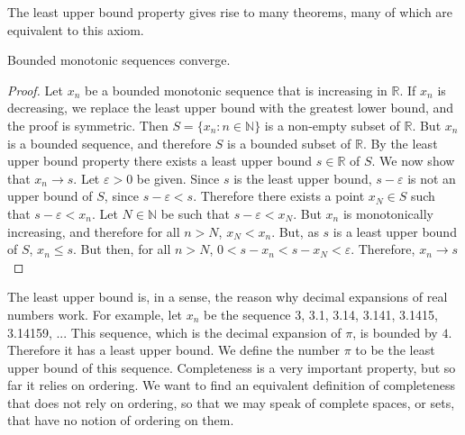 \documentclass[crop=false,class=article,oneside]{standalone}
\begin{document}
            The least upper bound property gives rise
            to many theorems, many of which are equivalent
            to this axiom.
            \begin{theorem}
                Bounded monotonic sequences converge.
            \end{theorem}
            \begin{proof}
                Let $x_{n}$ be a bounded monotonic sequence that is
                increasing in $\mathbb{R}$. If $x_{n}$ is decreasing, we
                replace the least upper bound with the greatest lower
                bound, and the proof is symmetric.
                Then $S=\{x_{n}:n\in\mathbb{N}\}$ is a
                non-empty subset of $\mathbb{R}$. But $x_{n}$ is
                a bounded sequence, and therefore $S$ is a bounded
                subset of $\mathbb{R}$.
                By the least upper bound property
                there exists a least upper bound $s\in\mathbb{R}$ of
                $S$. We now show that $x_{n}\rightarrow{s}$. Let
                $\varepsilon>0$ be given.
                Since $s$ is the least upper bound,
                $s-\varepsilon$ is not an upper bound of $S$, since
                $s-\varepsilon<s$. Therefore there exists a point
                $x_{N}\in{S}$ such that $s-\varepsilon<x_{n}$.
                Let $N\in\mathbb{N}$ be such that $s-\varepsilon<x_{N}$.
                But $x_{n}$ is monotonically increasing, and therefore
                for all $n>N$, $x_{N}<x_{n}$.
                But, as $s$ is a least upper
                bound of $S$, $x_{n}\leq{s}$. But then, for all $n>N$,
                $0<s-x_{n}<s-x_{N}<\varepsilon$.
                Therefore, $x_{n}\rightarrow{s}$
            \end{proof}
            The least upper bound is, in a sense, the
            reason why decimal expansions of
            real numbers work. For example, let $x_{n}$ be the
            sequence 3, 3.1, 3.14, 3.141, 3.1415, 3.14159, ...
            This sequence, which is the decimal expansion of $\pi$,
            is bounded by $4$. Therefore it has a least upper
            bound. We define the number $\pi$ to be the least upper
            bound of this sequence. Completeness is a very important
            property, but so far it relies on ordering.
            We want to find an equivalent definition of completeness
            that does not rely on ordering, so that we may speak of
            complete spaces, or sets, that have no notion of
            ordering on them.
\end{document}
